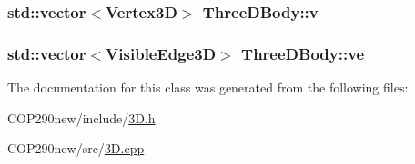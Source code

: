 \subsubsection[{\texorpdfstring{v}{v}}]{\setlength{\rightskip}{0pt plus 5cm}std\+::vector$<${\bf Vertex3D}$>$ Three\+D\+Body\+::v}\hypertarget{class_three_d_body_ae85a9587eced34b16806c2c2f009d208}{}\label{class_three_d_body_ae85a9587eced34b16806c2c2f009d208}
\subsubsection[{\texorpdfstring{ve}{ve}}]{\setlength{\rightskip}{0pt plus 5cm}std\+::vector$<${\bf Visible\+Edge3D}$>$ Three\+D\+Body\+::ve}\hypertarget{class_three_d_body_ab35d0ee77c7176e3133a9d3357d173e2}{}\label{class_three_d_body_ab35d0ee77c7176e3133a9d3357d173e2}


The documentation for this class was generated from the following files\+:\begin{DoxyCompactItemize}
\item 
C\+O\+P290new/include/\hyperlink{3_d_8h}{3\+D.\+h}\item 
C\+O\+P290new/src/\hyperlink{3_d_8cpp}{3\+D.\+cpp}\end{DoxyCompactItemize}
